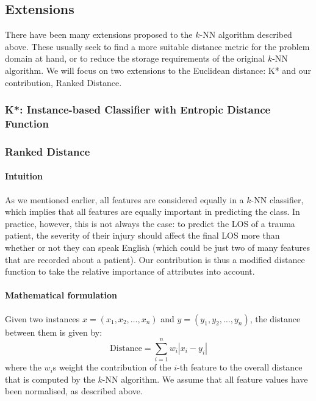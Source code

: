 \subsection{Extensions}
There have been many extensions proposed to the $k$-NN algorithm described
above. These usually seek to find a more suitable distance metric for the
problem domain at hand, or to reduce the storage requirements of the original
$k$-NN algorithm. We will focus on two extensions to the Euclidean distance:
K* and our contribution, Ranked Distance.

\subsubsection{K*: Instance-based Classifier with Entropic Distance Function}

\subsubsection{Ranked Distance}
\paragraph{Intuition}
As we mentioned earlier, all features are considered equally in a $k$-NN
classifier, which implies that all features are equally important in predicting
the class. In practice, however, this is not always the case: to predict the
LOS of a trauma patient, the severity of their injury should affect the final
LOS more than whether or not they can speak English (which could be just two
of many features that are recorded about a patient). Our contribution is thus
a modified distance function to take the relative importance of attributes into
account. 

\paragraph{Mathematical formulation}
Given two instances $x = (x_1,x_2,\ldots,x_n)$ and $y = (y_1,y_2,\ldots,y_n)$,
the distance between them is given by:
\begin{equation*}
\mathrm{Distance} = \sum_{i=1}^n w_i |x_i-y_i|
\end{equation*}
where the $w_i$s weight the contribution of the $i$-th feature to the overall
distance that is computed by the $k$-NN algorithm. We assume that all feature
values have been normalised, as described above.

